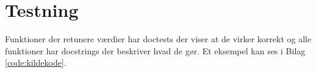 \documentclass{article}
\begin{document}
\newpage


\newpage


\section{Testning}
Funktioner der retunere værdier har doctests der viser at de virker korrekt og alle
funktioner har docstrings der beskriver hvad de gør. Et eksempel kan ses i Bilag \ref{code:kildekode}.

\newpage


\newpage

\end{document}

